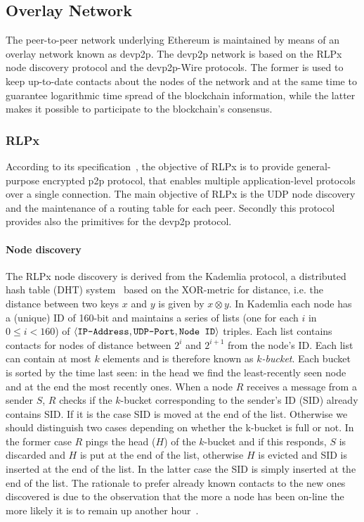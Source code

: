 \subsection{Overlay Network}
\label{sec:overlay-network}
The peer-to-peer network underlying Ethereum is maintained by means of an
overlay network known as devp2p. The devp2p network is based on the
RLPx node discovery protocol and the devp2p-Wire protocols.
The former is used to keep up-to-date contacts about
the nodes of the network and at the same time to guarantee logarithmic time
spread of the blockchain information,
while the latter makes it possible to participate to the
blockchain's consensus.

\subsubsection{RLPx}
According to its specification~\cite{bib:rlpx:spec}, the objective of RLPx is to
provide general-purpose encrypted p2p protocol, that enables multiple
application-level protocols over a single connection.
The main objective of RLPx is the UDP node discovery and the maintenance of a 
routing table for each peer. Secondly this protocol provides also the primitives
for the devp2p protocol.

\paragraph{Node discovery}
The RLPx node discovery is derived from the Kademlia protocol,
a distributed hash table (DHT) system~\cite{bib:kademlia}
based on the XOR-metric for
distance, i.e. the distance between two keys $x$ and $y$ is given
by $x \otimes y$.
In Kademlia each node has a (unique) ID of 160-bit and maintains a
series of lists (one for each $i$ in $0 \leq i < 160$) of
$\langle \verb|IP-Address|, \verb|UDP-Port|, \verb|Node ID| \rangle$ triples.
Each list contains contacts for nodes of distance between $2^i$ and $2^{i+1}$
from the node's ID.
Each list can contain at most $k$ elements and is therefore known as
\textit{$k$-bucket}.
Each bucket is sorted by the time last
seen: in the head we find the least-recently seen node and at the end the most
recently ones.
When a node $R$ receives a message from a sender $S$, $R$ checks if the
$k$-bucket corresponding to the sender's ID (SID) already contains SID.
If it is the case SID is moved at the end of the list. Otherwise we should
distinguish two cases depending on whether the k-bucket is full or not.
In the former case $R$ pings the head ($H$) of the $k$-bucket and if
this responds, $S$ is discarded and $H$ is put at the end of the list,
otherwise $H$ is evicted and SID is inserted at the end of the list.
In the latter case the SID is simply inserted at the end of the list.
The rationale to prefer already known contacts to the new ones discovered
is due to the observation that the more a node has been on-line the more
likely it is to remain up another hour~\cite{bib:kademlia}.

